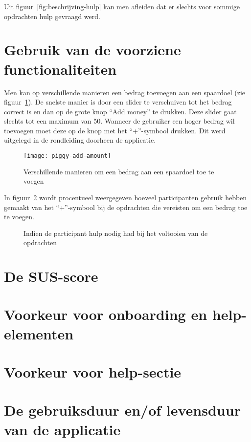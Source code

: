 Uit figuur~\ref{fig:beschrijving-hulp} kan men afleiden dat er slechts voor sommige opdrachten hulp gevraagd werd.

\section{Gebruik van de voorziene functionaliteiten}
\label{sec:gebruik-functionaliteiten}

Men kan op verschillende manieren een bedrag toevoegen aan een spaardoel (zie figuur~\ref{fig:piggy:add-amount}). De snelste manier is door een slider te verschuiven tot het bedrag correct is en dan op de grote knop ``Add money'' te drukken. Deze slider gaat slechts tot een maximum van 50. Wanneer de gebruiker een hoger bedrag wil toevoegen moet deze op de knop met het ``+''-symbool drukken. Dit werd uitgelegd in de rondleiding doorheen de applicatie.

\begin{figure}[h!]
    \centering
    \texttt{[image: piggy-add-amount]}
    \caption{Verschillende manieren om een bedrag aan een spaardoel toe te voegen}
    \label{fig:piggy:add-amount}
\end{figure}

In figuur~\ref{fig:beschrijving-plus} wordt procentueel weergegeven hoeveel participanten gebruik hebben gemaakt van het ``+''-symbool bij de opdrachten die vereisten om een bedrag toe te voegen.

\begin{figure}[h]
    \centering
    \qquad
    \caption{Indien de participant hulp nodig had bij het voltooien van de opdrachten}
    \label{fig:beschrijving-plus}
\end{figure}

\section{De SUS-score}
\label{sec:sus}

\section{Voorkeur voor onboarding en help-elementen}
\label{sec:voorkeur-onboarding}

\section{Voorkeur voor help-sectie}
\label{sec:voorkeur-help}

\section{De gebruiksduur en/of levensduur van de applicatie}
\label{sec:gebruiksduur}

